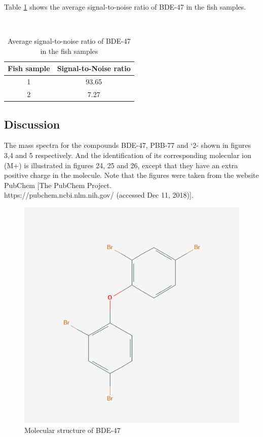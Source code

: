 \documentclass[a4paper, 12pt]{article}
\begin{document}
Table \ref{tab-sn} shows the average signal-to-noise ratio of BDE-47 in the fish samples.

\begin{table}[h!]
	\centering
	\caption{Average signal-to-noise ratio of BDE-47 in the fish samples}
	\hfill \\
	\begin{tabular}{|c|c|}
		\hline
		Fish sample & Signal-to-Noise ratio    \\ \hline
		1           & 93.65                    \\ \hline
		2           & 7.27                     \\ \hline
	\end{tabular}
	\label{tab-sn}
\end{table}



\subsection{Discussion}
\setcounter{figure}{23}
The mass spectra for the compounds BDE-47, PBB-77 and `2- shown in figures 3,4 and 5 respectively. And the identification of its corresponding molecular ion (M+) is illustrated in figures 24, 25 and 26, except that they have an extra positive charge in the molecule. Note that the figures were taken from the website PubChem [The PubChem Project. \\ https://pubchem.ncbi.nlm.nih.gov/ (accessed Dec 11, 2018)].

\begin{figure}[h!]
	\centering
	\includegraphics[width=1\textwidth]{bde-47.png}
	\caption{Molecular structure of BDE-47}
	\label{fig-bde}
\end{figure}
\end{document}
